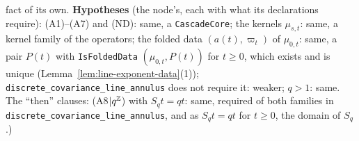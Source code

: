 \begin{lemma}
{fact of its own. \textbf{Hypotheses} (the node's, each with what its declarations require):
(A1)--(A7) and (ND): same, a \texttt{CascadeCore}; the kernels $\mu_{s,t}$: same, a kernel
family of the operators; the folded data $(a(t), \varpi_t)$ of $\mu_{0,t}$: same, a pair $P(t)$
with \texttt{IsFoldedData} $(\mu_{0,t}, P(t))$ for $t \ge 0$, which exists and is unique
(Lemma~\ref{lem:line-exponent-data}(1)); \texttt{discrete\_covariance\_line\_annulus} does not require
it: weaker; $q > 1$: same. The ``then'' clauses: (A8$|q^{\mathbb{Z}}$) with $S_qt = qt$: same, required of
both families in \texttt{discrete\_covariance\_line\_annulus}, and as $S_qt = qt$ for $t \ge 0$,
the domain of $S_q$.)}
\end{lemma}

